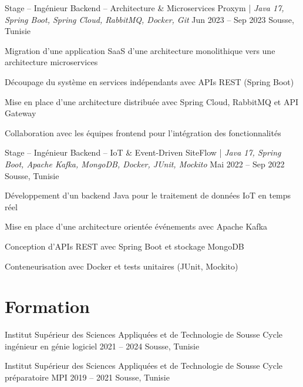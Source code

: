 \documentclass[letterpaper]{resume_config}
\begin{document}
\WorkExperience
{Stage -- Ingénieur Backend -- Architecture \& Microservices}
{Proxym | \textit{Java 17, Spring Boot, Spring Cloud, RabbitMQ, Docker, Git}}
{Jun 2023 -- Sep 2023}
{Sousse, Tunisie}
{
\item Migration d’une application SaaS d’une architecture monolithique vers une architecture microservices
\item Découpage du système en services indépendants avec APIs REST (Spring Boot)
\item Mise en place d’une architecture distribuée avec Spring Cloud, RabbitMQ et API Gateway
\item Collaboration avec les équipes frontend pour l’intégration des fonctionnalités
}

\WorkExperience
{Stage -- Ingénieur Backend -- IoT \& Event-Driven}
{SiteFlow | \textit{Java 17, Spring Boot, Apache Kafka, MongoDB, Docker, JUnit, Mockito}} 
{Mai 2022 -- Sep 2022}
{Sousse, Tunisie}
{
\item Développement d’un backend Java pour le traitement de données IoT en temps réel
\item Mise en place d’une architecture orientée événements avec Apache Kafka
\item Conception d’APIs REST avec Spring Boot et stockage MongoDB
\item Conteneurisation avec Docker et tests unitaires (JUnit, Mockito)
}

\vspace{-10pt}


\section{Formation}

\EducationExperience
{Institut Supérieur des Sciences Appliquées et de Technologie de Sousse}
{Cycle ingénieur en génie logiciel}
{2021 -- 2024}
{Sousse, Tunisie}

\EducationExperience
{Institut Supérieur des Sciences Appliquées et de Technologie de Sousse}
{Cycle préparatoire MPI}
{2019 -- 2021}
{Sousse, Tunisie}

\vspace{-10pt}

\end{document}
